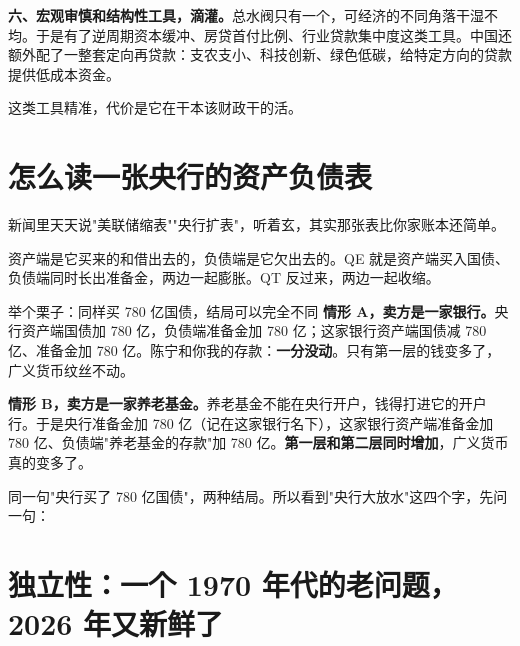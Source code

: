 \textbf{六、宏观审慎和结构性工具，滴灌。}总水阀只有一个，可经济的不同角落干湿不均。于是有了逆周期资本缓冲、房贷首付比例、行业贷款集中度这类工具。中国还额外配了一整套定向再贷款：支农支小、科技创新、绿色低碳，给特定方向的贷款提供低成本资金。

这类工具精准，代价是它在干本该财政干的活。

\section{怎么读一张央行的资产负债表}

新闻里天天说"美联储缩表""央行扩表"，听着玄，其实那张表比你家账本还简单。

\begin{bsheet}
\end{bsheet}

资产端是它买来的和借出去的，负债端是它欠出去的。QE 就是资产端买入国债、负债端同时长出准备金，两边一起膨胀。QT 反过来，两边一起收缩。

\begin{egbox}{举个栗子：同样买 780 亿国债，结局可以完全不同}
\textbf{情形 A，卖方是一家银行。}央行资产端国债加 780 亿，负债端准备金加 780 亿；这家银行资产端国债减 780 亿、准备金加 780 亿。陈宁和你我的存款：\textbf{一分没动}。只有第一层的钱变多了，广义货币纹丝不动。

\textbf{情形 B，卖方是一家养老基金。}养老基金不能在央行开户，钱得打进它的开户行。于是央行准备金加 780 亿（记在这家银行名下），这家银行资产端准备金加 780 亿、负债端"养老基金的存款"加 780 亿。\textbf{第一层和第二层同时增加}，广义货币真的变多了。

同一句"央行买了 780 亿国债"，两种结局。所以看到"央行大放水"这四个字，先问一句：

\end{egbox}

\section{独立性：一个 1970 年代的老问题，2026 年又新鲜了}

